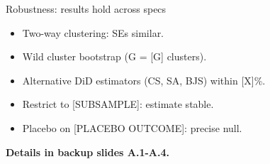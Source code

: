 
\begin{frame}{Robustness: results hold across specs}
  \begin{itemize}
    \item[\checkmark] Two-way clustering: SEs similar.
    \item[\checkmark] Wild cluster bootstrap (G = [G] clusters).
    \item[\checkmark] Alternative DiD estimators (CS, SA, BJS)
          within [X]\%.
    \item[\checkmark] Restrict to [SUBSAMPLE]: estimate stable.
    \item[\checkmark] Placebo on [PLACEBO OUTCOME]: precise null.
  \end{itemize}

  \medskip
  \textbf{Details in backup slides A.1-A.4.}
\end{frame}
